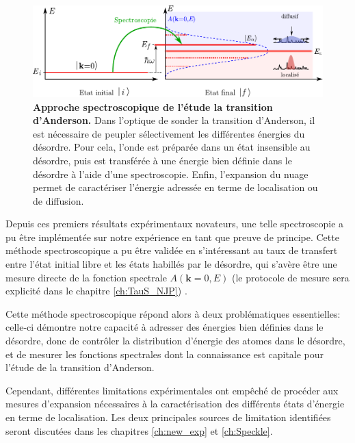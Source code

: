 \begin{figure}
\centering
\includegraphics[width=\textwidth]{Fig/Localisation/spectroscopie_anderson.pdf}
\caption{\textbf{Approche spectroscopique de l'étude la transition d'Anderson.} Dans l'optique de sonder la transition d'Anderson, il est nécessaire de peupler sélectivement les différentes énergies du désordre. Pour cela, l'onde est préparée dans un état insensible au désordre, puis est transférée à une énergie bien définie dans le désordre à l'aide d'une spectroscopie. Enfin, l'expansion du nuage permet de caractériser l'énergie adressée en terme de localisation ou de diffusion.}
\label{fig:spectroscopie_anderson}
\end{figure}


Depuis ces premiers résultats expérimentaux novateurs, une telle spectroscopie a pu être implémentée sur notre expérience en tant que preuve de principe. Cette méthode spectroscopique a pu être validée en s'intéressant au taux de transfert entre l'état initial libre et les états habillés par le désordre, qui s'avère être une mesure directe de la fonction spectrale $A(\mathbf{k}=0,E)$ (le protocole de mesure sera explicité dans le chapitre \ref{ch:TauS_NJP}) \citep{volchkov2018measurement}.

Cette méthode spectroscopique répond alors à deux problématiques essentielles: celle-ci démontre notre capacité à adresser des énergies bien définies dans le désordre, donc de contrôler la distribution d'énergie des atomes dans le désordre, et de mesurer les fonctions spectrales dont la connaissance est capitale pour l'étude de la transition d'Anderson.
 
Cependant, différentes limitations expérimentales ont empêché de procéder aux mesures d'expansion nécessaires à la caractérisation des différents états d'énergie en terme de localisation. Les deux principales sources de limitation identifiées seront discutées dans les chapitres \ref{ch:new_exp} et \ref{ch:Speckle}.


